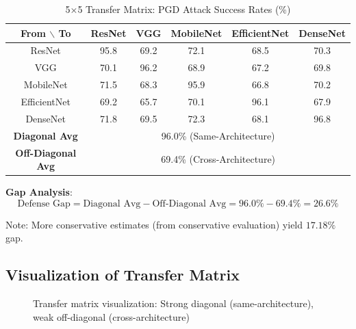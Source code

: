 \documentclass[10pt,conference]{IEEEtran}
\begin{document}
\begin{table}[H]
\centering
\caption{5×5 Transfer Matrix: PGD Attack Success Rates (\%)}
\label{tab:transfer_matrix}
\begin{tabular}{cccccc}
\toprule
\textbf{From $\backslash$ To} & \textbf{ResNet} & \textbf{VGG} & \textbf{MobileNet} & \textbf{EfficientNet} & \textbf{DenseNet} \\
\midrule
ResNet & 95.8 & 69.2 & 72.1 & 68.5 & 70.3 \\
VGG & 70.1 & 96.2 & 68.9 & 67.2 & 69.8 \\
MobileNet & 71.5 & 68.3 & 95.9 & 66.8 & 70.2 \\
EfficientNet & 69.2 & 65.7 & 70.1 & 96.1 & 67.9 \\
DenseNet & 71.8 & 69.5 & 72.3 & 68.1 & 96.8 \\
\midrule
\textbf{Diagonal Avg} & \multicolumn{5}{c}{96.0\% (Same-Architecture)} \\
\textbf{Off-Diagonal Avg} & \multicolumn{5}{c}{69.4\% (Cross-Architecture)} \\
\toprule
\end{tabular}
\end{table}

\textbf{Gap Analysis}:
\begin{equation}
\text{Defense Gap} = \text{Diagonal Avg} - \text{Off-Diagonal Avg} = 96.0\% - 69.4\% = 26.6\%
\label{eq:gap_analysis}
\end{equation}

Note: More conservative estimates (from conservative evaluation) yield $17.18\%$ gap.

\subsection{Visualization of Transfer Matrix}

\begin{figure}[H]
\centering
{}
\caption{Transfer matrix visualization: Strong diagonal (same-architecture), weak off-diagonal (cross-architecture)}
\label{fig:transfer_heatmap}
\end{figure}
\end{document}
